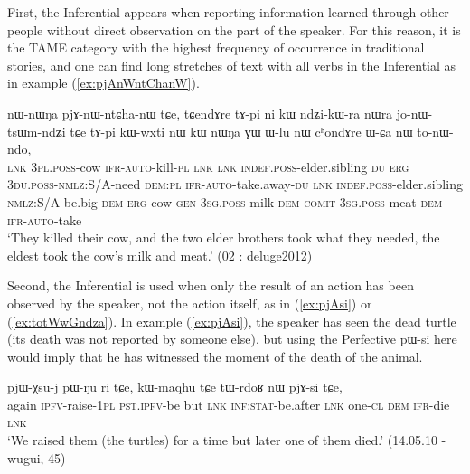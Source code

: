 \documentclass[oldfontcommands,oneside,a4paper,11pt]{article}
\newcommand{\ipa}[1]{{\phon \mbox{#1}}} %
\newcommand{\refb}[1]{(\ref{#1})}
\begin{document}
First, the Inferential appears when reporting information learned through other people without direct observation on the part of the speaker. For this reason, it is the TAME category with the highest frequency of occurrence in traditional stories, and one can find long stretches of text with all verbs in the Inferential as in example \refb{ex:pjAnWntChanW}.

\begin{exe}
\ex \label{ex:pjAnWntChanW}
\gll 	\ipa{tɕe,} \ipa{nɯ-nɯŋa} 	\ipa{pjɤ-nɯ-ntɕha-nɯ} 	\ipa{tɕe,} \ipa{tɕendɤre} 	\ipa{tɤ-pi} 	\ipa{ni} 	\ipa{kɯ} 	\ipa{ndʑi-kɯ-ra} 	\ipa{nɯra} 	\ipa{jo-nɯ-tsɯm-ndʑi} 	\ipa{tɕe} \ipa{tɤ-pi} 	\ipa{kɯ-wxti} 	\ipa{nɯ} 	\ipa{kɯ} 	\ipa{nɯŋa} 	\ipa{ɣɯ} 	 \ipa{ɯ-lu} 	\ipa{nɯ} 	\ipa{cʰondɤre} \ipa{ɯ-ɕa} 	\ipa{nɯ} 	\ipa{to-nɯ-ndo,} \\
\textsc{lnk} \textsc{3pl.poss}-cow \textsc{ifr}-\textsc{auto}-kill-\textsc{pl} \textsc{lnk}  \textsc{lnk} \textsc{indef.poss}-elder.sibling \textsc{du} \textsc{erg} \textsc{3du.poss}-\textsc{nmlz}:S/A-need \textsc{dem:pl} \textsc{ifr}-\textsc{auto}-take.away-\textsc{du} \textsc{lnk} \textsc{indef.poss}-elder.sibling \textsc{nmlz}:S/A-be.big \textsc{dem} \textsc{erg} cow \textsc{gen} \textsc{3sg.poss}-milk \textsc{dem} \textsc{comit}  \textsc{3sg.poss}-meat  \textsc{dem} \textsc{ifr}-\textsc{auto}-take \\
\glt `They killed their cow, and the two elder brothers took what they needed, the eldest took the cow's milk and meat.' (02 : deluge2012)
\end{exe}



Second, the Inferential is used when only the result of an action has been observed by the speaker, not the action itself, as in \refb{ex:pjAsi} or \refb{ex:totWwGndza}. In example \refb{ex:pjAsi}, the speaker has seen the dead turtle (its death was not reported by someone else), but using the Perfective \ipa{pɯ-si}  here would imply that he has witnessed the moment of the death of the animal. 

\begin{exe}
\ex  \label{ex:pjAsi}
\gll \ipa{li} 	\ipa{pjɯ-χsu-j} 	\ipa{pɯ-ŋu} 	\ipa{ri} 	\ipa{tɕe,} \ipa{kɯ-maqhu} 	\ipa{tɕe} 	\ipa{tɯ-rdoʁ} 	\ipa{nɯ} 	\ipa{pjɤ-si} 	\ipa{tɕe,} \\
again \textsc{ipfv}-raise-\textsc{1pl} \textsc{pst.ipfv}-be but \textsc{lnk} \textsc{inf:stat}-be.after \textsc{lnk}  one-\textsc{cl} \textsc{dem} \textsc{ifr}-die \textsc{lnk} \\
\glt `We raised them (the turtles) for a time but later one of them died.' (14.05.10 - wugui, 45)
\end{exe}
\end{document}
